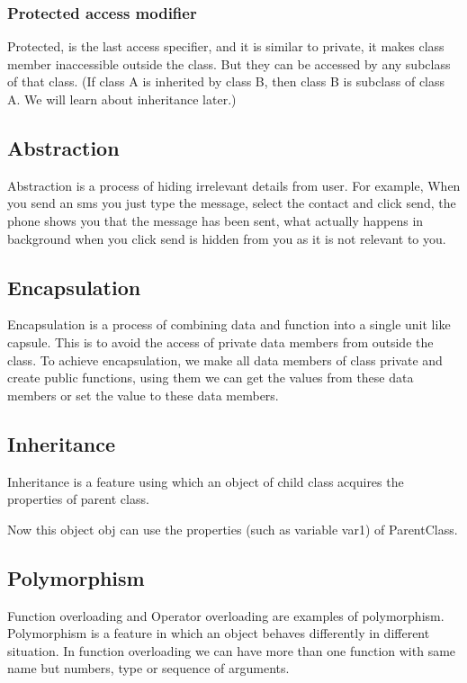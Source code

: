 \documentclass[11pt, a4paper]{article}
\begin{document}
\subsubsection{Protected access modifier}
Protected, is the last access specifier, and it is similar to private,
it makes class member inaccessible outside the class. But they can be accessed
by any subclass of that class. (If class A is inherited by class B, then class B
is subclass of class A. We will learn about inheritance later.)


\subsection{Abstraction}
Abstraction is a process of hiding irrelevant details from user. For example,
When you send an sms you just type the message, select the contact and click send,
the phone shows you that the message has been sent, what actually happens in background when you click send is hidden from you as it is not relevant to you.

\subsection{Encapsulation}
Encapsulation is a process of combining data and function into a single unit like capsule.
This is to avoid the access of private data members from outside the class.
To achieve encapsulation, we make all data members of class private and create public
functions, using them we can get the values from these data members or set the value
to these data members.

\subsection{Inheritance}
Inheritance is a feature using which an object of child class acquires
the properties of parent class.

Now this object obj can use the properties (such as variable var1) of ParentClass.

\subsection{Polymorphism}
Function overloading and Operator overloading are examples of polymorphism.
Polymorphism is a feature in which an object behaves differently in different situation.
In function overloading we can have more than one function with same name but numbers,
type or sequence of arguments.

\end{document}
